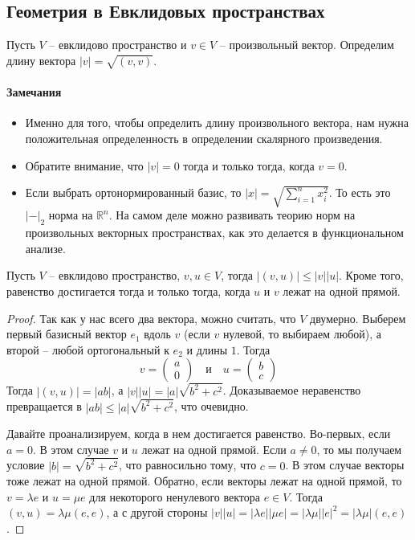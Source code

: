\subsection{Геометрия в Евклидовых пространствах}

\begin{definition}
Пусть $V$ -- евклидово пространство и $v\in V$ -- произвольный вектор.
Определим длину вектора $|v| = \sqrt{(v,v)}$.
\end{definition}

\paragraph{Замечания}

\begin{itemize}
\item Именно для того, чтобы определить длину произвольного вектора, нам нужна положительная определенность в определении скалярного произведения.

\item Обратите внимание, что $|v| = 0$ тогда и только тогда, когда $v = 0$.

\item Если выбрать ортонормированный базис, то $|x| = \sqrt{\sum_{i=1}^n x_i^2}$.
То есть это $|{-}|_2$ норма на $\mathbb R^n$.
На самом деле можно развивать теорию норм на произвольных векторных пространствах, как это делается в функциональном анализе.
\end{itemize}

\begin{claim}
Пусть $V$ -- евклидово пространство, $v,u\in V$, тогда $|(v,u)|\leqslant |v| |u|$.
Кроме того, равенство достигается тогда и только тогда, когда $u$ и $v$ лежат на одной прямой.
\end{claim}
\begin{proof}
Так как у нас всего два вектора, можно считать, что $V$ двумерно.
Выберем первый базисный вектор $e_1$ вдоль $v$ (если $v$ нулевой, то выбираем любой), а второй -- любой ортогональный к $e_2$ и длины $1$.
Тогда
\[
v = 
\begin{pmatrix}
{a}\\{0}
\end{pmatrix}
\quad\text{и}\quad
u = 
\begin{pmatrix}
{b}\\{c}
\end{pmatrix}
\]
Тогда $|(v, u)| = |ab|$, а $|v||u| = |a|\sqrt{b^2 + c^2}$.
Доказываемое неравенство превращается в $|ab|\leqslant |a|\sqrt{b^2 + c^2}$, что очевидно.

Давайте проанализируем, когда в нем достигается равенство.
Во-первых, если $a = 0$.
В этом случае $v$ и $u$ лежат на одной прямой.
Если $a \neq 0$, то мы получаем условие $|b| = \sqrt{b^2 + c^2}$, что равносильно тому, что $c = 0$.
В этом случае векторы тоже лежат на одной прямой.
Обратно, если векторы лежат на одной прямой, то $v = \lambda e$ и $u = \mu e$ для некоторого ненулевого вектора $e\in V$.
Тогда $(v,u) = \lambda\mu (e,e)$, а с другой стороны $|v||u| = |\lambda e||\mu e| = |\lambda \mu| |e|^2 = |\lambda \mu|(e,e)$.
\end{proof}


